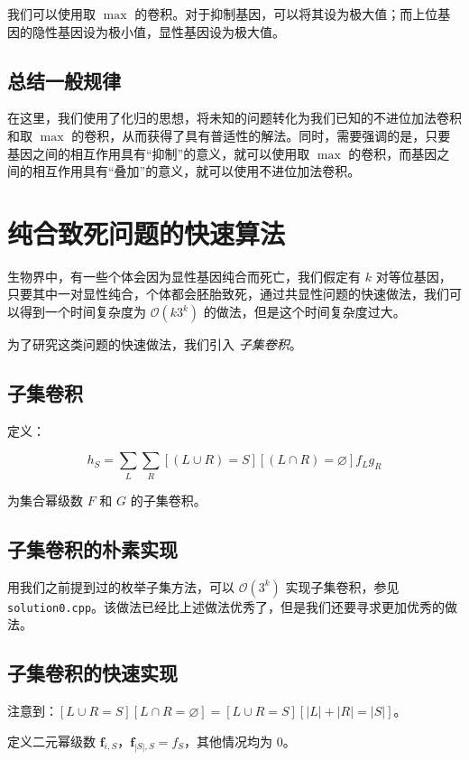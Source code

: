 \documentclass[12pt]{article} %
\begin{document}
我们可以使用取 $\max$ 的卷积。对于抑制基因，可以将其设为极大值；而上位基因的隐性基因设为极小值，显性基因设为极大值。

\subsection{总结一般规律}

在这里，我们使用了化归的思想，将未知的问题转化为我们已知的不进位加法卷积和取 $\max$ 的卷积，从而获得了具有普适性的解法。同时，需要强调的是，只要基因之间的相互作用具有“抑制”的意义，就可以使用取 $\max$ 的卷积，而基因之间的相互作用具有“叠加”的意义，就可以使用不进位加法卷积。

\newpage

\section{纯合致死问题的快速算法}

生物界中，有一些个体会因为显性基因纯合而死亡，我们假定有 $k$ 对等位基因，只要其中一对显性纯合，个体都会胚胎致死，通过共显性问题的快速做法，我们可以得到一个时间复杂度为 $\mathcal O(k 3^k)$ 的做法，但是这个时间复杂度过大。

为了研究这类问题的快速做法，我们引入 \textsl{子集卷积}。

\subsection{子集卷积}

定义：

$$h_S =\sum_{L} \sum_{R} [(L \cup R) = S][(L \cap R)=\varnothing] f_L g_R$$

为集合幂级数 $F$ 和 $G$ 的子集卷积。

\subsection{子集卷积的朴素实现}

用我们之前提到过的枚举子集方法，可以 $\mathcal O(3^k)$ 实现子集卷积，参见 \texttt{solution0.cpp}。该做法已经比上述做法优秀了，但是我们还要寻求更加优秀的做法。

\subsection{子集卷积的快速实现}

注意到：$[L\cup R=S][L\cap R=\varnothing]=[L\cup R=S][|L|+|R|=|S|]$。

定义二元幂级数 $\mathbf f_{i,S}$，$\mathbf f_{|S|,S}=f_{S}$，其他情况均为 $0$。
\end{document}
